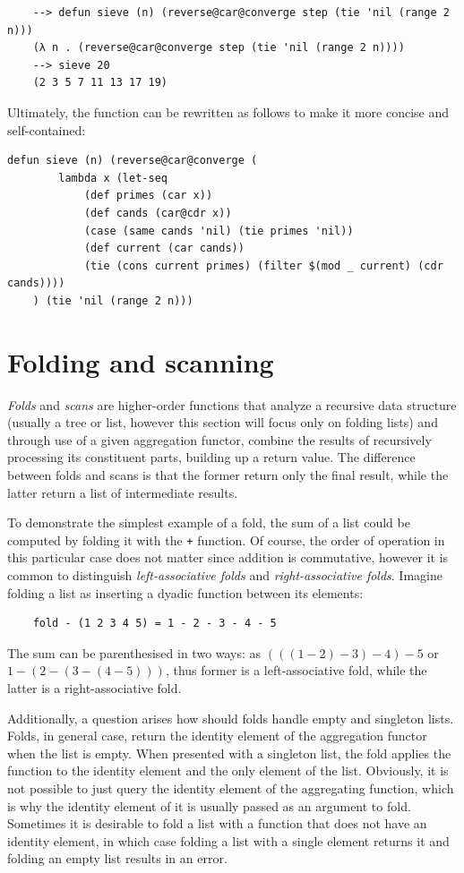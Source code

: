 \begin{Verbatim}
    --> defun sieve (n) (reverse@car@converge step (tie 'nil (range 2 n)))
    (λ n . (reverse@car@converge step (tie 'nil (range 2 n))))
    --> sieve 20
    (2 3 5 7 11 13 17 19)
\end{Verbatim}

Ultimately, the function can be rewritten as follows to make it more concise and self-contained:

\begin{Verbatim}
defun sieve (n) (reverse@car@converge (
        lambda x (let-seq
            (def primes (car x))
            (def cands (car@cdr x))
            (case (same cands 'nil) (tie primes 'nil))
            (def current (car cands))
            (tie (cons current primes) (filter $(mod _ current) (cdr cands))))
    ) (tie 'nil (range 2 n)))
\end{Verbatim}

\section{Folding and scanning}

\textit{Folds} and \textit{scans} are higher-order functions that analyze a recursive data structure (usually a tree or list, however this section will focus only on folding lists) and through use of a given aggregation functor, combine the results of recursively processing its constituent parts, building up a return value. The difference between folds and scans is that the former return only the final result, while the latter return a list of intermediate results.

To demonstrate the simplest example of a fold, the sum of a list could be computed by folding it with the \verb|+| function. Of course, the order of operation in this particular case does not matter since addition is commutative, however it is common to distinguish \textit{left-associative folds} and \textit{right-associative folds}. Imagine folding a list as inserting a dyadic function between its elements:

\begin{Verbatim}
    fold - (1 2 3 4 5) = 1 - 2 - 3 - 4 - 5
\end{Verbatim}

The sum can be parenthesised in two ways: as $(((1 - 2) - 3) - 4) - 5$ or $1 - (2 - (3 - (4 - 5)))$, thus former is a left-associative fold, while the latter is a right-associative fold.

Additionally, a question arises how should folds handle empty and singleton lists. Folds, in general case, return the identity element of the aggregation functor when the list is empty. When presented with a singleton list, the fold applies the function to the identity element and the only element of the list. Obviously, it is not possible to just query the identity element of the aggregating function, which is why the identity element of it is usually passed as an argument to fold. Sometimes it is desirable to fold a list with a function that does not have an identity element, in which case folding a list with a single element returns it and folding an empty list results in an error.

